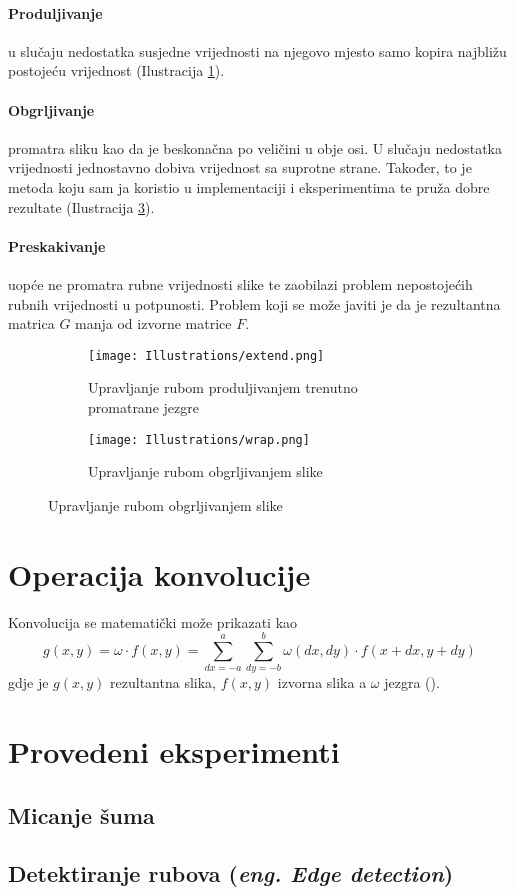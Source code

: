 \paragraph{Produljivanje}
u slučaju nedostatka susjedne vrijednosti na njegovo mjesto samo kopira najbližu postojeću vrijednost (Ilustracija \ref{fig:extend_edge}).

\paragraph{Obgrljivanje}
promatra sliku kao da je beskonačna po veličini u obje osi.
U slučaju nedostatka vrijednosti  jednostavno dobiva vrijednost sa suprotne strane.
Također, to je metoda koju sam ja koristio u implementaciji i eksperimentima te pruža dobre rezultate (Ilustracija \ref{fig:wrap_edge}).

\paragraph{Preskakivanje}
uopće ne promatra rubne vrijednosti slike te zaobilazi problem nepostojećih rubnih vrijednosti u potpunosti.
Problem koji se može javiti je da je rezultantna matrica $G$ manja od izvorne matrice $F$.

\begin{figure}
	\caption{Grafički prikaz dva različita načina upravljanja rubnim vrijednostima s označenim rubom slike i trenutnom pozicijom jezgre}
	\begin{subfigure}[t]{0.48\textwidth}
		\texttt{[image: Illustrations/extend.png]}
		\caption{Upravljanje rubom produljivanjem trenutno promatrane jezgre}
		\label{fig:extend_edge}
	\end{subfigure}
	\begin{subfigure}[t]{0.48\textwidth}
		\texttt{[image: Illustrations/wrap.png]}
		\caption{Upravljanje rubom obgrljivanjem slike}
		\label{fig:wrap_edge}
	\end{subfigure}
\end{figure}

\section{Operacija konvolucije}
Konvolucija se matematički može prikazati kao
$$g(x, y) = \omega \cdot f(x,y) = \sum_{dx=-a}^{a} \sum_{dy=-b}^{b} \omega(dx, dy)\cdot f(x + dx, y + dy)$$
gdje je $g(x,y)$ rezultantna slika, $f(x, y)$ izvorna slika a $\omega$ jezgra (\cite{conv_wiki}).

\section{Provedeni eksperimenti}

\subsection{Micanje šuma}


\subsection{Detektiranje rubova (\emph{eng. Edge detection})}


